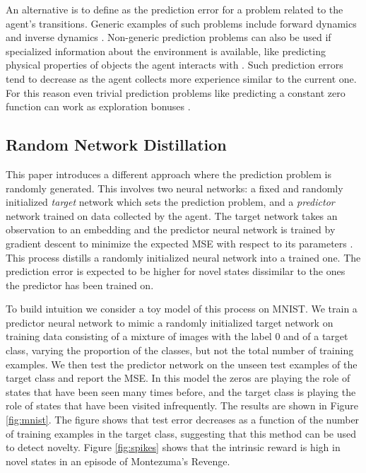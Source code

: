 \documentclass{article} \usepackage[dvipsnames]{xcolor}
\begin{document}
An alternative is to define  as the prediction error for a problem related to the agent's transitions. Generic examples of such problems include forward dynamics \citep{schmidhuber_curiosity,stadie2015incentivizing,josh_surprise,pathakICMl17curiosity,burda18largescale} and inverse dynamics \citep{haber2018learning}. Non-generic prediction problems can also be used if specialized information about the environment is available, like predicting physical properties of objects the agent interacts with \citep{denil2016learning}. Such prediction errors tend to decrease as the agent collects more experience similar to the current one. For this reason even trivial prediction problems like predicting a constant zero function can work as exploration bonuses \citep{fox2018dora}.

\subsection{Random Network Distillation}

\label{sec:rnd}



This paper introduces a different approach where the prediction problem is randomly generated. This involves two neural networks: a fixed and randomly initialized \emph{target} network which sets the prediction problem, and a \emph{predictor} network trained on data collected by the agent. The target network takes an observation to an embedding  and the predictor neural network  is trained by gradient descent to minimize the expected MSE  with respect to its parameters . This process distills a randomly initialized neural network into a trained one. The prediction error is expected to be higher for novel states dissimilar to the ones the predictor has been trained on.

To build intuition we consider a toy model of this process on MNIST. We train a predictor neural network to mimic a randomly initialized target network on training data consisting of a mixture of images with the label 0 and of a target class, varying the proportion of the classes, but not the total number of training examples. We then test the predictor network on the unseen test examples of the target class and report the MSE. In this model the zeros are playing the role of states that have been seen many times before, and the target class is playing the role of states that have been visited infrequently. The results are shown in Figure \ref{fig:mnist}. The figure shows that test error decreases as a function of the number of training examples in the target class, suggesting that this method can be used to detect novelty. Figure \ref{fig:spikes} shows that the intrinsic reward is high in novel states in an episode of Montezuma's Revenge.
\end{document}
